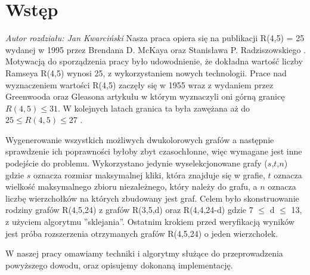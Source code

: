 \chapter{Wstęp}

\textit{Autor rozdziału: Jan Kwarciński}
\vspace{0.5cm}\newline
Nasza praca opiera się na publikacji R(4,5) = 25 wydanej w 1995 przez Brendana D. McKaya oraz Stanisława P. Radziszowskiego  \cite{mainpaper}. Motywacją do sporządzenia pracy było udowodnienie, że dokładna wartość liczby Ramseya R(4,5) wynosi 25, z wykorzystaniem nowych technologii. Prace nad wyznaczeniem wartości R(4,5) zaczęły się w 1955 wraz z wydaniem przez Greenwooda oraz Gleasona\cite{gandg} artykułu w którym wyznaczyli oni górną granicę $R(4,5) \leq 31$. W kolejnych latach granica ta była zawężana aż do $25 \leq R(4,5) \leq 27$ \cite{jgbound, mrbound}.\par
Wygenerowanie wszystkich możliwych dwukolorowych grafów a następnie sprawdzenie ich poprawności byłoby zbyt czasochłonne, więc wymagane jest inne podejście do problemu. Wykorzystano jedynie wyselekcjonowane grafy ($s$,$t$,$n$) gdzie $s$ oznacza rozmiar maksymalnej kliki, która znajduje się w grafie, $t$ oznacza wielkość maksymalnego zbioru niezależnego, który należy do grafu, a $n$ oznacza liczbę wierzchołków na których zbudowany jest graf. Celem było skonstruowanie rodziny grafów R(4,5,24) z grafów R(3,5,d) oraz R(4,4,24-d) gdzie 7 $\leq$ d $\leq$ 13, z użyciem algorytmu ''sklejania''. Ostatnim krokiem przed weryfikacją wyników jest próba rozszerzenia otrzymanych grafów R(4,5,24) o jeden wierzchołek.

W naszej pracy omawiamy techniki i algorytmy służące do przeprowadzenia powyższego dowodu, oraz opisujemy dokonaną implementację.


